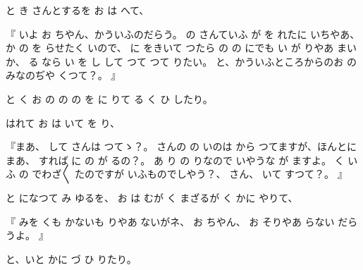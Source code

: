 と
き
さんとするを
お
は
へて、

『
いよ
お
ちやん、かういふのだらう。
の
さんていふ
が
を
れたに
いちやあ、
か
の
を
らせたく
いので、
に
をきいて
つたら
の
の
にでも
い
が
りやあ
まいか、
る
なら
い
を
し
して
つて
つて
りたい。
と、かういふところからのお
の
みなのぢや
くつて？。
』

と
く
お
の
の
の
を
に
りて
る
く
ひ
したり。

はれて
お
は
いて
を
り、

『まあ、
して
さんは
つてゝ？。
さんの
の
いのは
から
つてますが、ほんとにまあ、
すれば
に
の
が
るの？。
あ
り
の
りなので
いやうな
が
ますよ。
く
いふ
の
でわざ〳〵
たのですが
いふものでしやう？、
さん、
いて
すつて？。
』

と
になつて
み
ゆるを、
お
は
むが
く
まざるが
く
かに
やりて、

『
みを
くも
かないも
りやあ
ないがネ、
お
ちやん、
お
そりやあ
らない
だらうよ。
』

と、いと
かに
づ
ひ
りたり。

